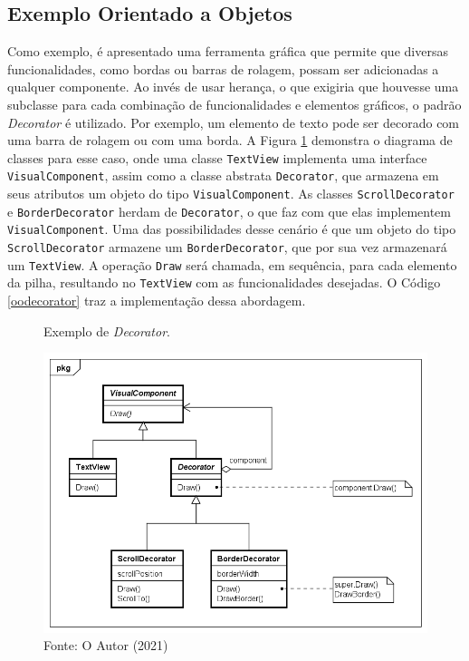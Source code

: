 \subsection*{Exemplo Orientado a Objetos}

Como exemplo, é apresentado uma ferramenta  
gráfica que permite que diversas funcionalidades, 
como bordas ou barras de rolagem, possam ser adicionadas 
a qualquer componente. Ao invés de usar herança, 
o que exigiria que houvesse uma subclasse para cada 
combinação de funcionalidades e elementos gráficos, 
o padrão \textit{Decorator} é utilizado. Por exemplo, um 
elemento de texto pode ser decorado com uma barra 
de rolagem ou com uma borda. A Figura \ref{decorator_exemplo} 
demonstra o diagrama de classes para esse caso, 
onde uma classe \texttt{TextView} implementa uma interface 
\texttt{VisualComponent}, assim como a classe abstrata \texttt{Decorator}, 
que armazena em seus atributos um objeto do tipo 
\texttt{VisualComponent}. As classes \texttt{ScrollDecorator} e 
\texttt{BorderDecorator} herdam de \texttt{Decorator}, o que faz com que 
elas implementem \texttt{VisualComponent}. Uma das 
possibilidades desse cenário é que um objeto do tipo 
\texttt{ScrollDecorator} armazene um \texttt{BorderDecorator}, que 
por sua vez armazenará um \texttt{TextView}. A operação 
\texttt{Draw} será chamada, em sequência, para cada 
elemento da pilha, resultando no \texttt{TextView} 
com as funcionalidades desejadas. O Código 
\ref{oodecorator} traz a implementação dessa 
abordagem.

\begin{figure}[htb]
	\caption{\label{decorator_exemplo}Exemplo de \textit{Decorator}.}
	\begin{center}
	    \includegraphics[scale=0.5]{5_padroes-contexto-funcional/5.2_estruturais/5.2.4_decorator/decorator_exemplo.png}
	\end{center}
  \caption*{Fonte: O Autor (2021)}
\end{figure}

